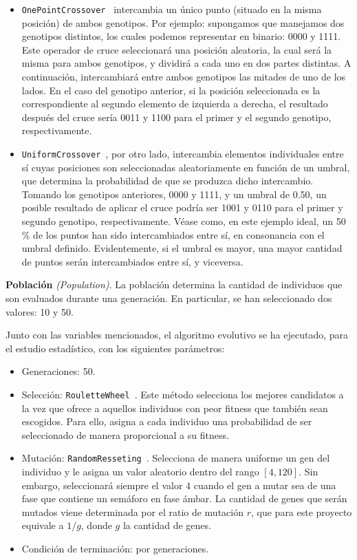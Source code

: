 \begin{itemize}
    \item \texttt{OnePointCrossover}~\cite{eiben_422_2003} intercambia un único punto (situado en la misma posición) de ambos genotipos. Por ejemplo: supongamos que manejamos dos genotipos distintos, los cuales podemos representar en binario: 0000 y 1111. Este operador de cruce seleccionará una posición aleatoria, la cual será la misma para ambos genotipos, y dividirá a cada uno en dos partes distintas. A continuación, intercambiará entre ambos genotipos las mitades de uno de los lados. En el caso del genotipo anterior, si la posición seleccionada es la correspondiente al segundo elemento de izquierda a derecha, el resultado después del cruce sería 0011 y 1100 para el primer y el segundo genotipo, respectivamente.
    \item \texttt{UniformCrossover}~\cite{eiben_422_2003}, por otro lado, intercambia elementos individuales entre sí cuyas posiciones son seleccionadas aleatoriamente en función de un umbral, que determina la probabilidad de que se produzca dicho intercambio. Tomando los genotipos anteriores, 0000 y 1111, y un umbral de 0.50, un posible resultado de aplicar el cruce podría ser 1001 y 0110 para el primer y segundo genotipo, respectivamente. Véase como, en este ejemplo ideal, un 50 \% de los puntos han sido intercambiados entre sí, en consonancia con el umbral definido. Evidentemente, si el umbral es mayor, una mayor cantidad de puntos serán intercambiados entre sí, y viceversa.
\end{itemize}


\textbf{Población} \textit{(Population)}. La población determina la cantidad de individuos que son evaluados durante una generación. En particular, se han seleccionado dos valores: 10 y 50.

Junto con las variables mencionados, el algoritmo evolutivo se ha ejecutado, para el estudio estadístico, con los siguientes parámetros:

\begin{itemize}
    \item Generaciones: 50. 
    \item Selección: \texttt{RouletteWheel}~\cite{lipowski_roulette-wheel_2012}. Este método selecciona los mejores candidatos a la vez que ofrece a aquellos individuos con peor fitness que también sean escogidos. Para ello, asigna a cada individuo una probabilidad de ser seleccionado de manera proporcional a su fitness.
    \item Mutación: \texttt{RandomResseting}~\cite{abrante_dorta_framework_2019}. Selecciona de manera uniforme un gen del individuo y le asigna un valor aleatorio dentro del rango $[4,120]$. Sin embargo, seleccionará siempre el valor $4$ cuando el gen a mutar sea de una fase que contiene un semáforo en fase ámbar. La cantidad de genes que serán mutados viene determinada por el ratio de mutación $r$, que para este proyecto equivale a $1 / g$, donde $g$ la cantidad de genes.
    \item Condición de terminación: por generaciones.
\end{itemize}



